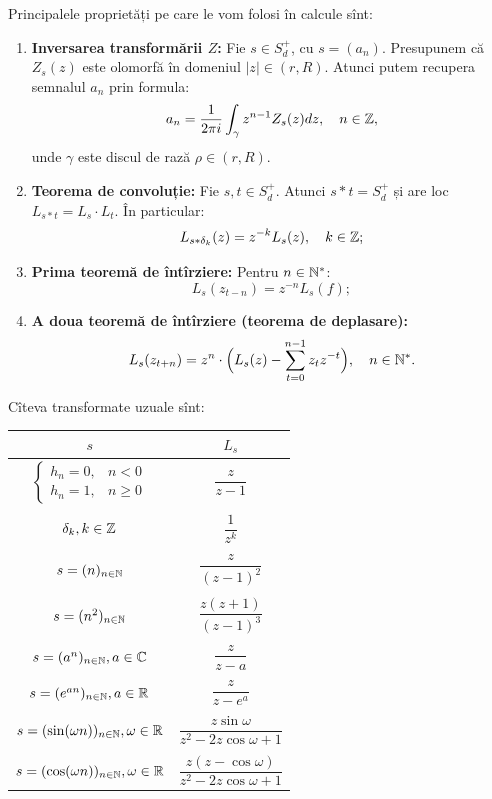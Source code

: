 Principalele proprietăți pe care le vom folosi în calcule sînt:
\begin{enumerate}[(1)]
\item \textbf{Inversarea transformării $ Z $:} Fie $ s \in S_d^+ $, cu $ s = (a_n) $.
  Presupunem că $ Z_s(z) $ este olomorfă în domeniul $ |z| \in (r, R) $. Atunci
  putem recupera semnalul $ a_n $ prin formula:
  \[
    a_n = \dfrac{1}{2 \pi i} \int_{\gamma} z^{n-1} Z_s(z) dz, \quad n \in \mathbb{Z},
  \]
  unde $ \gamma $ este discul de rază $ \rho \in (r, R) $.
\item \textbf{Teorema de convoluție:} Fie $ s, t \in S_d^+ $. Atunci $ s \ast t = S_d^+ $
  și are loc $ L_{s \ast t} = L_s \cdot L_t $. În particular:
  \[
    L_{s \ast \delta_k}(z) = z^{-k} L_s(z), \quad k \in \mathbb{Z};
  \]
\item \textbf{Prima teoremă de întîrziere:} Pentru $ n\in \mathbb{N}^\ast $:
  \[
    L_s( z_{t - n}) = z^{-n} L_s(f);
  \]
\item \textbf{A doua teoremă de întîrziere (teorema de deplasare):}
  \[
    L_s(z_{t + n}) = z^n \cdot \Big( L_s(z) - \sum_{t = 0}^{n-1} z_t z^{-t} \Big), \quad n \in \mathbb{N}^\ast.
  \]
\end{enumerate}

Cîteva transformate uzuale sînt:
\begin{tabular}{c | c}
  $ s $ & $ L_s $ \\
  \hline\hline
  $ \begin{cases}
    h_n = 0, & n < 0 \\
    h_n = 1, & n \geq 0
  \end{cases} $ & $ \dfrac{z}{z - 1} $ \\
        & \\
  $ \delta_k, k \in \mathbb{Z} $ & $ \dfrac{1}{z^k} $ \\
        &\\
  $ s = (n)_{n \in \mathbb{N}} $ & $ \dfrac{z}{(z - 1)^2} $ \\
        &\\
  $ s = (n^2)_{n \in \mathbb{N}} $ & $ \dfrac{z(z+1)}{(z - 1)^3} $ \\
        &\\
  $ s = (a^n)_{n \in \mathbb{N}}, a \in \mathbb{C} $ & $ \dfrac{z}{z - a} $ \\
        &\\
  $ s = (e^{an})_{n \in \mathbb{N}}, a \in \mathbb{R} $ & $ \dfrac{z}{z - e^a} $ \\
        &\\
  $ s = (\sin(\omega n))_{n \in \mathbb{N}}, \omega \in \mathbb{R} $ & $ \dfrac{z \sin \omega}{z^2 - 2z \cos \omega + 1} $ \\
        &\\
  $ s = (\cos(\omega n))_{n \in \mathbb{N}}, \omega \in \mathbb{R} $ & $ \dfrac{z(z - \cos \omega)}{z^2 - 2z \cos \omega + 1} $
\end{tabular}

